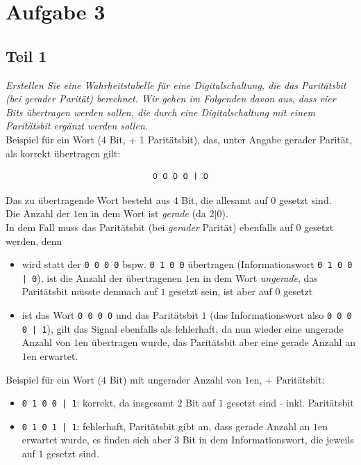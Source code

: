 \chapter{Aufgabe 3}

\section{Teil 1}

\textit{Erstellen Sie eine Wahrheitstabelle für eine Digitalschaltung, die das Paritätsbit (bei gerader Parität) berechnet.
Wir gehen im Folgenden davon aus, dass vier Bits übertragen werden sollen,  die durch eine Digitalschaltung mit einem Paritätsbit ergänzt werden sollen.} \\

\noindent
Beispiel für ein Wort (4 Bit, + 1 Paritätsbit), das, unter Angabe gerader Parität, als korrekt übertragen gilt:

\begin{equation}\notag
    \texttt{0 0 0 0 | 0}
\end{equation}

\noindent
Das zu übertragende Wort besteht aus $4$ Bit, die allesamt auf $0$ gesetzt sind.\\
Die Anzahl der $1$en in dem Wort ist \textit{gerade} (da $2|0$).\\
In dem Fall muss das Paritätsbit (bei \textit{gerader} Parität) ebenfalls auf $0$ gesetzt werden, denn

\begin{itemize}
    \itemsep0.5em
    \item wird statt der \texttt{0 0 0 0} bspw. \texttt{0 1 0 0} übertragen (Informationswort \texttt{0 1 0 0 | 0}), ist die Anzahl der übertragenen $1$en in dem Wort \textit{ungerade}, das Paritätsbit müsste demnach auf $1$ gesetzt sein, ist aber auf $0$ gesetzt
    \item ist das Wort \texttt{0 0 0 0} und das Paritätsbit $1$ (das Informationswort also \texttt{0 0 0 0 | 1}), gilt das Signal ebenfalls als fehlerhaft, da nun wieder eine ungerade Anzahl von $1$en übertragen wurde, das Paritätsbit aber eine gerade Anzahl an $1$en erwartet.
\end{itemize}

\noindent
Beispiel für ein Wort ($4$ Bit) mit ungerader Anzahl von $1$en, + Paritätsbit:

\begin{itemize}
    \itemsep0.5em
    \item \texttt{0 1 0 0 | 1}: korrekt, da insgesamt $2$ Bit auf $1$ gesetzt sind - inkl. Paritätsbit
    \item \texttt{0 1 0 1 | 1}: fehlerhaft, Paritätsbit gibt an, dass gerade Anzahl an $1$en erwartet wurde, es finden sich aber $3$ Bit in dem Informationswort, die jeweils auf $1$ gesetzt sind.
\end{itemize}


